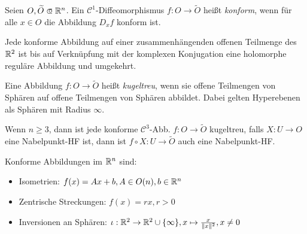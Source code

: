 \documentclass{cheat-sheet}
\newcommand{\Cont}{\mathcal{C}} %
\begin{document}
\begin{defn}
  Seien $O, \widetilde{O} \opn \R^n$. Ein $\Cont^1$-Diffeomorphismus $f : O \to \widetilde{O}$ heißt \emph{konform}, wenn für alle $x \in O$ die Abbildung $D_x f$ konform ist.
\end{defn}

\iffalse
\begin{bem}[Konforme Abbildungen im $\R^2$]
  Sei $O \opn \C \cong \R^2$ zusammenhängend und $f : O \to \widetilde{O}$ konform.
  Sei $\lambda : O \to \R_{> 0}$ der konforme Faktor, \dh{} $\lambda(x)^{-1} D_x f \in O(n)$.
  Ohne Einschränkung ist $\det(D_x f) > 0$ für alle $x \in O$ (sonst $\widetilde{f} = f \circ \overline{\,\cdot\,}$).
  Es folgt: $D_x f = \lambda(x) \begin{psmallmatrix} \cos \alpha_x & \sin \alpha_x \\ -\sin \alpha_x & \cos \alpha_x \end{psmallmatrix} = \lambda(x) \cdot e^{i \alpha_x} \in \C$, also ist $f$ holomorph.
\end{bem}
\fi

\begin{satz}
  Jede konforme Abbildung auf einer zusammenhängenden offenen Teilmenge des $\R^2$ ist bis auf Verknüpfung mit der komplexen Konjugation eine holomorphe reguläre Abbildung und umgekehrt.
\end{satz}

\begin{defn}
  Eine Abbildung $f : O \to \widetilde{O}$ heißt \emph{kugeltreu}, wenn sie offene Teilmengen von Sphären auf offene Teilmengen von Sphären abbildet. Dabei gelten Hyperebenen als Sphären mit Radius $\infty$.
\end{defn}

\begin{satz}
  Wenn $n \geq 3$, dann ist jede konforme $\Cont^3$-Abb. $f : O \to \widetilde{O}$ kugeltreu, \dh{} falls $X : U \to O$ eine Nabelpunkt-HF ist, dann ist $f \circ X : U \to \widetilde{O}$ auch eine Nabelpunkt-HF.
\end{satz}



\begin{bsp}
  Konforme Abbildungen im $\mathbb{R}^n$ sind:
  \begin{itemize}
    \item Isometrien: $f(x) = Ax + b, A \in O(n), b \in \mathbb{R}^n$
    \item Zentrische Streckungen: $f(x) = rx, r > 0$
    \item Inversionen an Sphären: $\iota : \mathbb{R}^2 \to \mathbb{R}^2 \cup \{ \infty \}, x \mapsto \tfrac{x}{\lVert x\rVert^2}, x \not= 0$
  \end{itemize}
\end{bsp}
\end{document}
